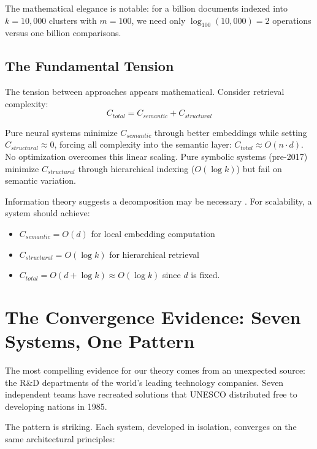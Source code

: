 \documentclass[manuscript,screen,nonacm]{acmart}
\begin{document}
The mathematical elegance is notable: for a billion documents indexed into $k=10,000$ clusters with $m=100$, we need only $\log_{100}(10,000) = 2$ operations versus one billion comparisons.

\subsection{The Fundamental Tension}

The tension between approaches appears mathematical. Consider retrieval complexity:
\[ C_{total} = C_{semantic} + C_{structural} \]

Pure neural systems minimize $C_{semantic}$ through better embeddings while setting $C_{structural} \approx 0$, forcing all complexity into the semantic layer: $C_{total} \approx O(n \cdot d)$. No optimization overcomes this linear scaling. Pure symbolic systems (pre-2017) minimize $C_{structural}$ through hierarchical indexing ($O(\log k)$) but fail on semantic variation.

Information theory suggests a decomposition may be necessary \cite{chen2025}. For scalability, a system should achieve:
\begin{itemize}
    \item $C_{semantic} = O(d)$ for local embedding computation
    \item $C_{structural} = O(\log k)$ for hierarchical retrieval
    \item $C_{total} = O(d + \log k) \approx O(\log k)$ since $d$ is fixed.
\end{itemize}

\section{The Convergence Evidence: Seven Systems, One Pattern}

The most compelling evidence for our theory comes from an unexpected source: the R\&D departments of the world's leading technology companies. Seven independent teams have recreated solutions that UNESCO distributed free to developing nations in 1985.

The pattern is striking. Each system, developed in isolation, converges on the same architectural principles:
\end{document}
